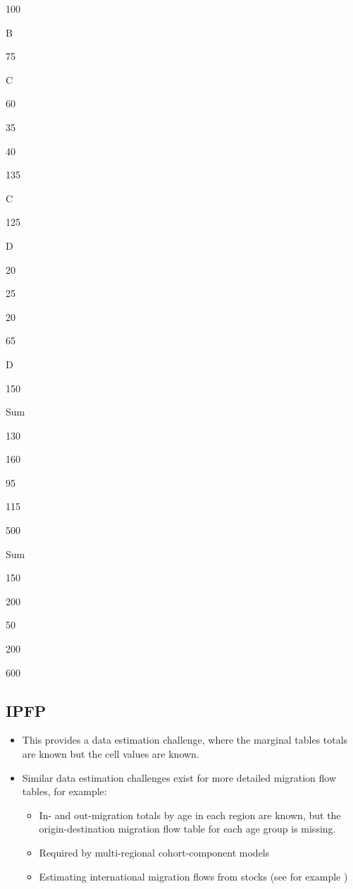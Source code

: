 \documentclass[
]{book}
\providecommand{\tightlist}{%
  \setlength{\itemsep}{0pt}\setlength{\parskip}{0pt}}
\begin{document}
100

B

75

C

60

35

40

135

C

125

D

20

25

20

65

D

150

Sum

130

160

95

115

500

Sum

150

200

50

200

600

\hypertarget{ipfp-2}{%
\subsection{IPFP}\label{ipfp-2}}

\begin{itemize}
\tightlist
\item
  This provides a data estimation challenge, where the marginal tables totals are known but the cell values are known.
\item
  Similar data estimation challenges exist for more detailed migration flow tables, for example:

  \begin{itemize}
  \tightlist
  \item
    In- and out-migration totals by age in each region are known, but the origin-destination migration flow table for each age group is missing.
  \item
    Required by multi-regional cohort-component models
  \item
    Estimating international migration flows from stocks (see for example \citet{Abel2013} )
  \end{itemize}
\end{itemize}
\end{document}
